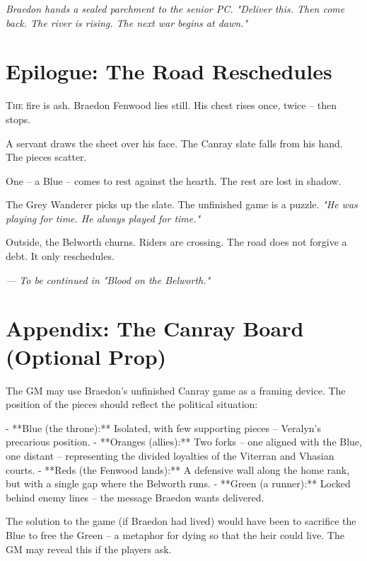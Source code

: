 \documentclass[11pt]{book}
\begin{document}
\vspace{1em}
\noindent\textit{Braedon hands a sealed parchment to the senior PC. "Deliver this. Then come back. The river is rising. The next war begins at dawn."}

\clearpage

\chapter{Epilogue: The Road Reschedules}

\lettrine{T}{he} fire is ash. Braedon Fenwood lies still. His chest rises once, twice -- then stops.

A servant draws the sheet over his face. The Canray slate falls from his hand. The pieces scatter.

One -- a Blue -- comes to rest against the hearth. The rest are lost in shadow.

\vspace{1em}
\noindent The Grey Wanderer picks up the slate. The unfinished game is a puzzle. \emph{"He was playing for time. He always played for time."}

\vspace{1em}
\noindent Outside, the Belworth churns. Riders are crossing. The road does not forgive a debt. It only reschedules.

\vspace{2em}
\noindent\textit{--- To be continued in "Blood on the Belworth."}

\clearpage
\chapter*{Appendix: The Canray Board (Optional Prop)}
The GM may use Braedon's unfinished Canray game as a framing device. The position of the pieces should reflect the political situation:

- **Blue (the throne):** Isolated, with few supporting pieces -- Veralyn's precarious position.
- **Oranges (allies):** Two forks -- one aligned with the Blue, one distant -- representing the divided loyalties of the Viterran and Vhasian courts.
- **Reds (the Fenwood lands):** A defensive wall along the home rank, but with a single gap where the Belworth runs.
- **Green (a runner):** Locked behind enemy lines -- the message Braedon wants delivered.

The solution to the game (if Braedon had lived) would have been to sacrifice the Blue to free the Green -- a metaphor for dying so that the heir could live. The GM may reveal this if the players ask.
\end{document}
